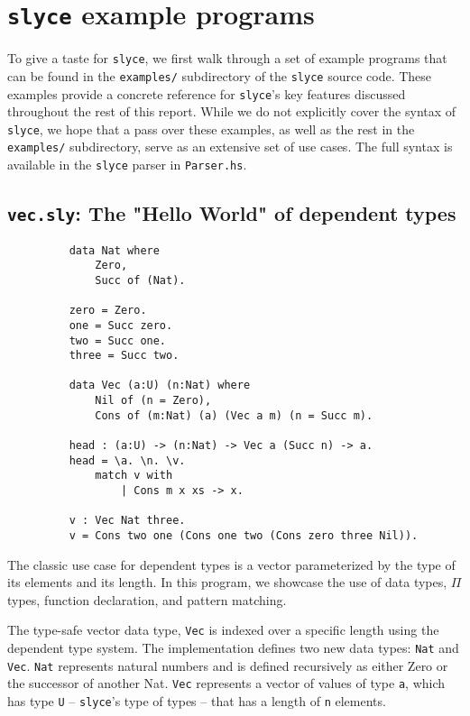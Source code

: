 \section{\texttt{slyce} example programs}
To give a taste for \texttt{slyce}, we first walk through a set of example
programs that can be found in the \texttt{examples/} subdirectory of the \texttt{slyce} source code.
These examples provide a concrete reference for \texttt{slyce}'s key features discussed throughout the rest of this report.
While we do not explicitly cover the syntax of \texttt{slyce}, we hope that a
pass over these examples, as well as the rest in the \texttt{examples/} subdirectory, serve as an extensive set of use cases.
The full syntax is available in the \texttt{slyce} parser in \texttt{Parser.hs}.
 
\subsection{\texttt{vec.sly}: The "Hello World" of dependent types}
\begin{figure}[h!]
\begin{lstlisting}
    data Nat where
        Zero,
        Succ of (Nat).

    zero = Zero.
    one = Succ zero.
    two = Succ one.
    three = Succ two.

    data Vec (a:U) (n:Nat) where
        Nil of (n = Zero),
        Cons of (m:Nat) (a) (Vec a m) (n = Succ m).

    head : (a:U) -> (n:Nat) -> Vec a (Succ n) -> a.
    head = \a. \n. \v.
        match v with
            | Cons m x xs -> x.

    v : Vec Nat three.
    v = Cons two one (Cons one two (Cons zero three Nil)).
\end{lstlisting}
\end{figure}

The classic use case for dependent types is a vector parameterized by the type
of its elements and its length.
In this program, we showcase the use of data types, $\Pi$ types, function declaration, and pattern matching.

The type-safe vector data type, \texttt{Vec} is indexed over a specific length using the dependent type system. 
The implementation defines two new data types: \texttt{Nat} and \texttt{Vec}. 
\texttt{Nat} represents natural numbers and is defined recursively as either Zero or the successor of another Nat. 
\texttt{Vec} represents a vector of values of type \texttt{a}, which has type \texttt{U} -- \texttt{slyce}'s type of types -- that has a length of \texttt{n} elements.

